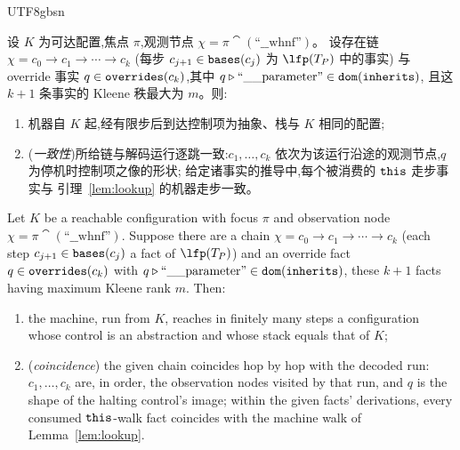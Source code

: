 \begin{CJK*}{UTF8}{gbsn}
\begin{lemma}\label{lem:sim-backward}
  \ifPaperChinese
  设 $K$ 为可达配置,焦点 $\pi$,观测节点 $\chi = \pi \cat (\text{``\_\_whnf''})$。
  设存在链 $\chi = c_0 \to c_1 \to \cdots \to c_k$
  (每步 $c_{j+1} \in \mathtt{bases}(c_j)$ 为 $\lfp(T_P)$ 中的事实)
  与 override 事实 $q \in \mathtt{overrides}(c_k)$,其中
  $q \mathbin{\triangleright} \text{``\_\_parameter''} \in \mathtt{dom}(\mathtt{inherits})$,
  且这 $k{+}1$ 条事实的 Kleene 秩最大为 $m$。则:
  \begin{enumerate}
    \item[(1)] 机器自 $K$ 起,经有限步后到达控制项为抽象、栈与 $K$ 相同的配置;
    \item[(2)] (\emph{一致性})所给链与解码运行逐跳一致:$c_1, \ldots, c_k$
      依次为该运行沿途的观测节点,$q$ 为停机时控制项之像的形状;
      给定诸事实的推导中,每个被消费的 $\mathtt{this}$ 走步事实与
      引理~\ref{lem:lookup} 的机器走步一致。
  \end{enumerate}
  \else
  Let $K$ be a reachable configuration with focus $\pi$ and
  observation node $\chi = \pi \cat (\text{``\_\_whnf''})$. Suppose there
  are a chain $\chi = c_0 \to c_1 \to \cdots \to c_k$ (each step
  $c_{j+1} \in \mathtt{bases}(c_j)$ a fact of $\lfp(T_P)$) and an override
  fact $q \in \mathtt{overrides}(c_k)$ with
  $q \mathbin{\triangleright} \text{``\_\_parameter''} \in \mathtt{dom}(\mathtt{inherits})$, these $k{+}1$
  facts having maximum Kleene rank $m$. Then:
  \begin{enumerate}
    \item[(1)] the machine, run from $K$, reaches in finitely many
      steps a configuration whose control is an abstraction and
      whose stack equals that of $K$;
    \item[(2)] (\emph{coincidence}) the given chain coincides hop by
      hop with the decoded run: $c_1, \ldots, c_k$ are, in order,
      the observation nodes visited by that run, and $q$ is the
      shape of the halting control's image; within the given facts'
      derivations, every consumed $\mathtt{this}$-walk fact coincides with
      the machine walk of Lemma~\ref{lem:lookup}.
  \end{enumerate}
  \fi
\end{lemma}


\end{CJK*}
